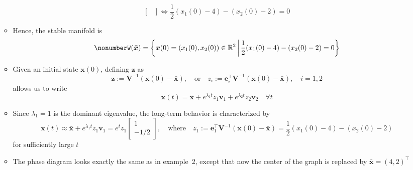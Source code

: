 \documentclass[12pt,a4paper]{article}
\begin{document}
\begin{itemize}
\begin{itemize}
\begin{equation}
\begin{bmatrix}
      \end{bmatrix}
      \iff
      \frac{1}{2}(x_{1}(0)-4) - (x_{2}(0)-2) = 0
      \end{equation}
    \item Hence, the stable manifold is
      \begin{equation}\nonumber%
        W(\bar{\bm{x}}) = \left\{\bm{x}(0)=(x_{1}(0),x_{2}(0))\in \R^{2}\,\bigg|\, \frac{1}{2}(x_{1}(0)-4) - (x_{2}(0)-2) = 0 \right\}
      \end{equation}
    \item Given an initial state $\bm{x}(0)$,
      defining $\bm{z}$ as
      \begin{equation}\nonumber%
        \bm{z} := \bm{V}^{-1}(\bm{x}(0)-\bar{\bm{x}}),
        \quad\text{or}\quad
        z_{i} := \bm{e}_{i}^{\top}\bm{V}^{-1}(\bm{x}(0)-\bar{\bm{x}}),
        \quad i = 1, 2
      \end{equation}
      allows us to write
    \begin{equation}\nonumber%
      \bm{x}(t)
      =
      \bar{\bm{x}} + 
      e^{\lambda_{1}t}z_{1}\bm{v}_{1}
      +
      e^{\lambda_{2}t}z_{2}\bm{v}_{2}
      \quad \forall t
    \end{equation}
    \item Since $\lambda_{1}=1$ is the dominant eigenvalue,
      the long-term behavior is characterized by
    \begin{equation}\nonumber%
      \bm{x}(t)
      \approx
      \bar{\bm{x}} +
      e^{\lambda_{1}t}z_{1}\bm{v}_{1}
      =
      e^{t}z_{1}
      \begin{bmatrix}
        1 \\ -1/2
      \end{bmatrix},
      \quad\text{where}\quad
      z_{1}:=\bm{e}_{1}^{\top}\bm{V}^{-1}(\bm{x}(0)-\bar{\bm{x}})
      = \frac{1}{2}(x_{1}(0)-4) - (x_{2}(0)-2)
    \end{equation}
    for sufficiently large $t$
  \item The phase diagram looks exactly the same as in example~2,
    except that now the center of the graph is replaced by $\bar{\bm{x}}=(4,2)^{\top}$
  \end{itemize}


\end{itemize}
\end{document}

